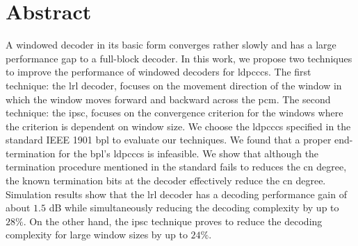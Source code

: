 \chapter*{Abstract}
A windowed decoder in its basic form converges rather slowly and has a large performance gap to a full-block decoder. In this work, we propose two techniques to improve the performance of windowed decoders for \glspl{ldpccc}. The first technique: the \acrshort{lrl} decoder, focuses on the movement direction of the window in which the window moves forward and backward across the \gls{pcm}. The second technique: the \acrshort{ipsc}, focuses on the convergence criterion for the windows where the criterion is dependent on window size. We choose the \glspl{ldpccc} specified in the standard IEEE 1901 \gls{bpl} to evaluate our techniques. We found that a proper end-termination for the \gls{bpl}'s \glspl{ldpccc} is infeasible. We show that although the termination procedure mentioned in the standard fails to reduces the \gls{cn} degree, the known termination bits at the decoder effectively reduce the \gls{cn} degree. Simulation results show that the \acrshort{lrl} decoder has a decoding performance gain of about $1.5$ dB while simultaneously reducing the decoding complexity by up to $28\%$. On the other hand, the \acrshort{ipsc} technique proves to reduce the decoding complexity for large window sizes by up to $24\%$.
